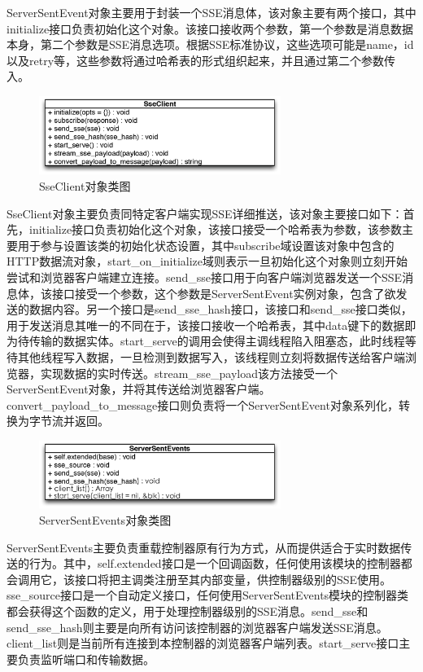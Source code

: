 ServerSentEvent对象主要用于封装一个SSE消息体，该对象主要有两个接口，其中initialize接口负责初始化这个对象。该接口接收两个参数，第一个参数是消息数据本身，第二个参数是SSE消息选项。根据SSE标准协议，这些选项可能是name，id以及retry等，这些参数将通过哈希表的形式组织起来，并且通过第二个参数传入。

\begin{figure}[h]
\centering
\includegraphics[width=0.7\textwidth]{images/detail/sse_client_class.eps}
\caption{SseClient对象类图}
\label{fig-sseclient-class}
\end{figure}

SseClient对象主要负责同特定客户端实现SSE详细推送，该对象主要接口如下：首先，initialize接口负责初始化这个对象，该接口接受一个哈希表为参数，该参数主要用于参与设置该类的初始化状态设置，其中subscribe域设置该对象中包含的HTTP数据流对象，start\_on\_initialize域则表示一旦初始化这个对象则立刻开始尝试和浏览器客户端建立连接。send\_sse接口用于向客户端浏览器发送一个SSE消息体，该接口接受一个参数，这个参数是ServerSentEvent实例对象，包含了欲发送的数据内容。另一个接口是send\_sse\_hash接口，该接口和send\_sse接口类似，用于发送消息其唯一的不同在于，该接口接收一个哈希表，其中data键下的数据即为待传输的数据实体。start\_serve的调用会使得主调线程陷入阻塞态，此时线程等待其他线程写入数据，一旦检测到数据写入，该线程则立刻将数据传送给客户端浏览器，实现数据的实时传送。stream\_sse\_payload该方法接受一个ServerSentEvent对象，并将其传送给浏览器客户端。convert\_payload\_to\_message接口则负责将一个ServerSentEvent对象系列化，转换为字节流并返回。

\begin{figure}[h]
\centering
\includegraphics[width=0.7\textwidth]{images/detail/sses_class.eps}
\caption{ServerSentEvents对象类图}
\label{fig-sses-class}
\end{figure}

ServerSentEvents主要负责重载控制器原有行为方式，从而提供适合于实时数据传送的行为。其中，self.extended接口是一个回调函数，任何使用该模块的控制器都会调用它，该接口将把主调类注册至其内部变量，供控制器级别的SSE使用。sse\_source接口是一个自动定义接口，任何使用ServerSentEvents模块的控制器类都会获得这个函数的定义，用于处理控制器级别的SSE消息。send\_sse和send\_sse\_hash则主要是向所有访问该控制器的浏览器客户端发送SSE消息。client\_list则是当前所有连接到本控制器的浏览器客户端列表。start\_serve接口主要负责监听端口和传输数据。

